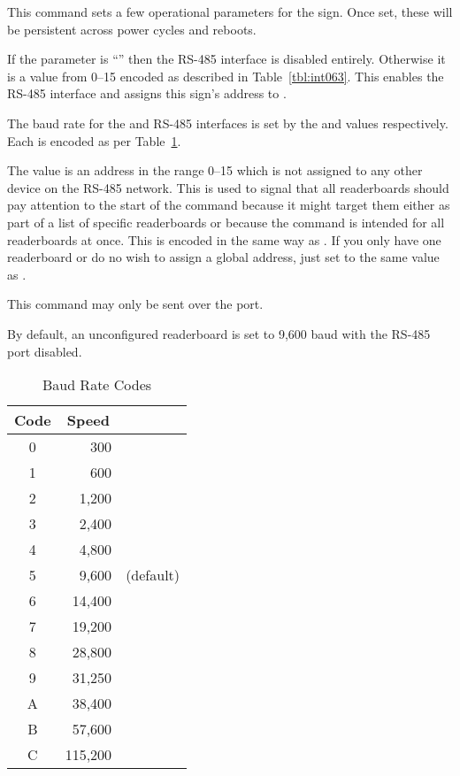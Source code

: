 This command sets a few operational parameters for the sign. Once set, these will be persistent across
power cycles and reboots.

If the  parameter is ``\z{\_}'' then the RS-485 interface is disabled entirely. Otherwise it is a
value from 0--15 encoded as described in Table~\ref{tbl:int063}. This enables the RS-485 interface and assigns
this sign's address to .

The baud rate for the  and RS-485 interfaces is set by the  and  values
respectively. Each is encoded as per Table~\ref{tbl:baudcodes}.

The  value is an address in the range 0--15 which is not assigned
to any other device on the RS-485 network. This is used to signal that all
readerboards should pay attention to the start of the command because it might
target them either as part of a list of specific readerboards or because the
command is intended for all readerboards at once. This is encoded in the 
same way as .
If you only have one readerboard or do no wish to assign a global address,
just set  to the same value as .

This command may only be sent over the  port.

By default, an unconfigured readerboard is set to 9,600 baud with the RS-485 port disabled.
\begin{table}
	\begin{center}
		\begin{tabular}{crl}\toprule
			\bfseries Code & \multicolumn{1}{c}{\bfseries Speed} \\\midrule
			0 & 300\\
			1 & 600\\
			2 & 1,200\\
			3 & 2,400\\
			4 & 4,800\\
			5 & 9,600 & (default)\\
			6 & 14,400\\
			7 & 19,200\\
			8 & 28,800\\
			9 & 31,250\\
			A & 38,400\\
			B & 57,600\\
			C & 115,200\\
		\bottomrule
		\end{tabular}
		\caption{Baud Rate Codes\label{tbl:baudcodes}}
	\end{center}
\end{table}

